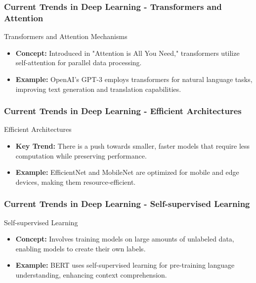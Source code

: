 \documentclass[aspectratio=169]{beamer}
\begin{document}
\begin{frame}[fragile]
    \frametitle{Current Trends in Deep Learning - Transformers and Attention}
    \begin{block}{Transformers and Attention Mechanisms}
        \begin{itemize}
            \item \textbf{Concept:} Introduced in "Attention is All You Need," transformers utilize self-attention for parallel data processing.
            \item \textbf{Example:} OpenAI's GPT-3 employs transformers for natural language tasks, improving text generation and translation capabilities.
        \end{itemize}
    \end{block}
\end{frame}

\begin{frame}[fragile]
    \frametitle{Current Trends in Deep Learning - Efficient Architectures}
    \begin{block}{Efficient Architectures}
        \begin{itemize}
            \item \textbf{Key Trend:} There is a push towards smaller, faster models that require less computation while preserving performance.
            \item \textbf{Example:} EfficientNet and MobileNet are optimized for mobile and edge devices, making them resource-efficient.
        \end{itemize}
    \end{block}
\end{frame}

\begin{frame}[fragile]
    \frametitle{Current Trends in Deep Learning - Self-supervised Learning}
    \begin{block}{Self-supervised Learning}
        \begin{itemize}
            \item \textbf{Concept:} Involves training models on large amounts of unlabeled data, enabling models to create their own labels.
            \item \textbf{Example:} BERT uses self-supervised learning for pre-training language understanding, enhancing context comprehension.
        \end{itemize}
    \end{block}
\end{frame}
\end{document}
